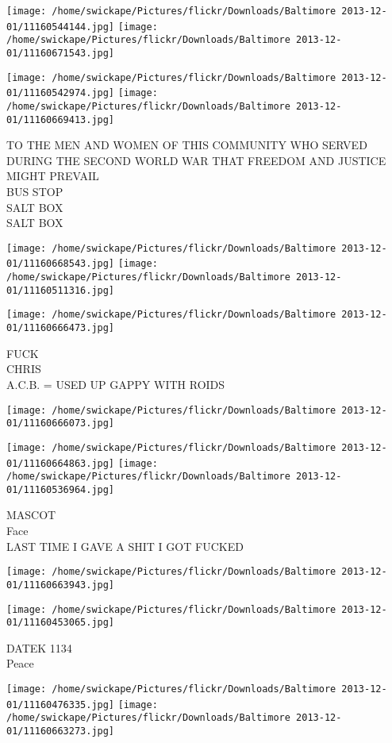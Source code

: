 \documentclass[10pt,letterpaper]{article}
\begin{document}
\texttt{[image: /home/swickape/Pictures/flickr/Downloads/Baltimore 2013-12-01/11160544144.jpg]}
\texttt{[image: /home/swickape/Pictures/flickr/Downloads/Baltimore 2013-12-01/11160671543.jpg]}

\texttt{[image: /home/swickape/Pictures/flickr/Downloads/Baltimore 2013-12-01/11160542974.jpg]}
\texttt{[image: /home/swickape/Pictures/flickr/Downloads/Baltimore 2013-12-01/11160669413.jpg]}

TO THE MEN AND WOMEN OF THIS COMMUNITY WHO SERVED DURING THE SECOND WORLD WAR THAT FREEDOM AND JUSTICE MIGHT PREVAIL\\
BUS STOP\\
SALT BOX\\
SALT BOX
\pagebreak

\texttt{[image: /home/swickape/Pictures/flickr/Downloads/Baltimore 2013-12-01/11160668543.jpg]}
\texttt{[image: /home/swickape/Pictures/flickr/Downloads/Baltimore 2013-12-01/11160511316.jpg]}

\texttt{[image: /home/swickape/Pictures/flickr/Downloads/Baltimore 2013-12-01/11160666473.jpg]}

FUCK\\
CHRIS\\
A.C.B. = USED UP GAPPY WITH ROIDS
\pagebreak

\texttt{[image: /home/swickape/Pictures/flickr/Downloads/Baltimore 2013-12-01/11160666073.jpg]}

\vspace{0.25in}
\texttt{[image: /home/swickape/Pictures/flickr/Downloads/Baltimore 2013-12-01/11160664863.jpg]}
\texttt{[image: /home/swickape/Pictures/flickr/Downloads/Baltimore 2013-12-01/11160536964.jpg]}

MASCOT\\
Face\\
LAST TIME I GAVE A SHIT I GOT FUCKED
\pagebreak

\texttt{[image: /home/swickape/Pictures/flickr/Downloads/Baltimore 2013-12-01/11160663943.jpg]}

\vspace{0.25in}
\texttt{[image: /home/swickape/Pictures/flickr/Downloads/Baltimore 2013-12-01/11160453065.jpg]}

DATEK 1134\\
Peace
\pagebreak

\texttt{[image: /home/swickape/Pictures/flickr/Downloads/Baltimore 2013-12-01/11160476335.jpg]}
\texttt{[image: /home/swickape/Pictures/flickr/Downloads/Baltimore 2013-12-01/11160663273.jpg]}
\end{document}
